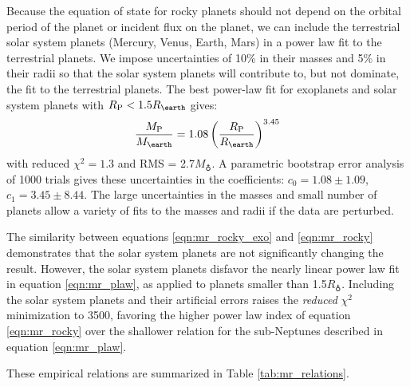 \documentclass[iop]{emulateapj}
\newcommand{\rpl}{\ensuremath{R_{\rm P}}}
\newcommand{\mpl}{\ensuremath{M_{\rm P}}}
\newcommand{\rearth}{\ensuremath{R_\earth}}
\newcommand{\mearth}{\ensuremath{M_\earth}}
\begin{document}
Because the equation of state for rocky planets should not depend on the orbital period of the planet or incident flux on the planet, we can include the terrestrial solar system planets (Mercury, Venus, Earth, Mars) in a power law fit to the terrestrial planets.  We impose uncertainties of 10\% in their masses and 5\% in their radii so that the solar system planets will contribute to, but not dominate, the fit to the terrestrial planets.  The best power-law fit for exoplanets and solar system planets with $\rpl < 1.5 \rearth$ gives:
\begin{equation}
\frac{\mpl}{\mearth} = 1.08 \left(\frac{\rpl}{\rearth}\right)^{3.45}
\label{eqn:mr_rocky}
\end{equation}
with reduced $\chi^2 = 1.3$ and RMS = 2.7\mearth.  A parametric bootstrap error analysis of 1000 trials gives these uncertainties in the coefficients: $c_0 =1.08 \pm 1.09$, $c_1 = 3.45\pm 8.44$.  The large uncertainties in the masses and small number of planets allow a variety of fits to the masses and radii if the data are perturbed.  

The similarity between equations \ref{eqn:mr_rocky_exo} and \ref{eqn:mr_rocky} demonstrates that the solar system planets are not significantly changing the result.  However, the solar system planets disfavor the nearly linear power law fit in equation \ref{eqn:mr_plaw}, as applied to planets smaller than 1.5\rearth.  Including the solar system planets and their artificial errors raises the \textit{reduced} $\chi^2$ minimization to 3500, favoring the higher power law index of equation \ref{eqn:mr_rocky} over the shallower relation for the sub-Neptunes described in equation \ref{eqn:mr_plaw}.

These empirical relations are summarized in Table \ref{tab:mr_relations}.
\end{document}
